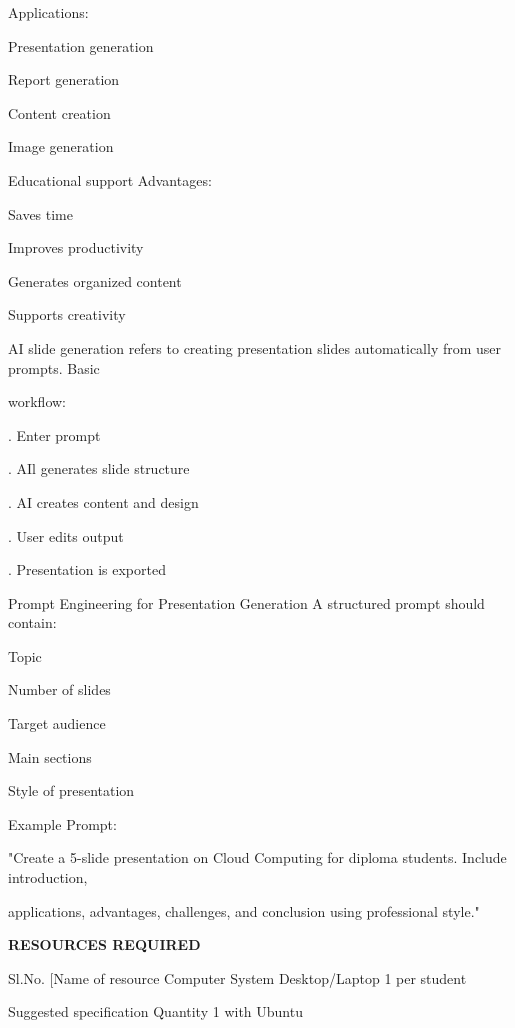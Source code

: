 \documentclass[10pt,a4paper]{article}
\begin{document}
\noindent Applications:\par
\noindent\textbullet\; Presentation generation\par
\noindent\textbullet\; Report generation\par
\noindent\textbullet\; Content creation\par
\noindent\textbullet\; Image generation\par
\noindent\textbullet\; Educational support Advantages:\par
\noindent\textbullet\; Saves time\par
\noindent\textbullet\; Improves productivity\par
\noindent\textbullet\; Generates organized content\par
\noindent\textbullet\; Supports creativity\par
\noindent AI slide generation refers to creating presentation slides automatically from user prompts. Basic\par
\noindent workflow:\par
{}. Enter prompt\par
{}. AIl generates slide structure\par
{}. AI creates content and design\par
{}. User edits output\par
{}. Presentation is exported\par
\noindent Prompt Engineering for Presentation Generation A structured prompt should contain:\par
\clearpage
\noindent\textbullet\; Topic\par
\noindent\textbullet\; Number of slides\par
\noindent\textbullet\; Target audience\par
\noindent\textbullet\; Main sections\par
\noindent\textbullet\; Style of presentation\par

\noindent Example Prompt:\par
\noindent "Create a 5-slide presentation on Cloud Computing for diploma students. Include introduction,\par
\noindent applications, advantages, challenges, and conclusion using professional style."\par

\medskip\noindent\textbf{RESOURCES REQUIRED}\par
\noindent Sl.No. [Name of resource               Computer System Desktop/Laptop    1 per student\par
\noindent Suggested specification Quantity 1     with Ubuntu\par
\end{document}
